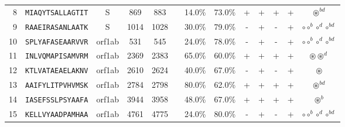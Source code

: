 \begin{tabular}{rcccccccccccc}
8  &  \texttt{MIAQYTSALLAGTIT} &       S &    869 &   883 &                &                          14.0\% &                           73.0\% &          + &           + &          + &           + &                                                                   $ \circledast^{bd} $ \\
9  &  \texttt{RAAEIRASANLAATK} &       S &   1014 &  1028 &                &                          30.0\% &                           79.0\% &          - &           + &          - &           + &                                                   $ \circ \circ^b \circ^d \circ^{bd} $ \\
10 &  \texttt{SPLYAFASEAARVVR} &  orf1ab &    531 &   545 &                &                          24.0\% &                           78.0\% &          - &           + &          - &           + &                                                   $ \circ \circ^b \circ^d \circ^{bd} $ \\
11 &  \texttt{INLVQMAPISAMVRM} &  orf1ab &   2369 &  2383 &                &                          65.0\% &                           60.0\% &          + &           + &          + &           + &                                                          $ \circledast \circledast^d $ \\
12 &  \texttt{KTLVATAEAELAKNV} &  orf1ab &   2610 &  2624 &                &                          40.0\% &                           67.0\% &          - &           + &          - &           + &                                                                        $ \circledast $ \\
13 &  \texttt{AAIFYLITPVHVMSK} &  orf1ab &   2784 &  2798 &                &                          80.0\% &                           62.0\% &          + &           + &          + &           + &                                                                   $ \circledast^{bd} $ \\
14 &  \texttt{IASEFSSLPSYAAFA} &  orf1ab &   3944 &  3958 &                &                          48.0\% &                           67.0\% &          + &           + &          + &           + &                                                                      $ \circledast^b $ \\
15 &  \texttt{KELLVYAADPAMHAA} &  orf1ab &   4761 &  4775 &                &                          24.0\% &                           80.0\% &          - &           + &          - &           + &                                                   $ \circ \circ^b \circ^d \circ^{bd} $ \\

\end{tabular}
